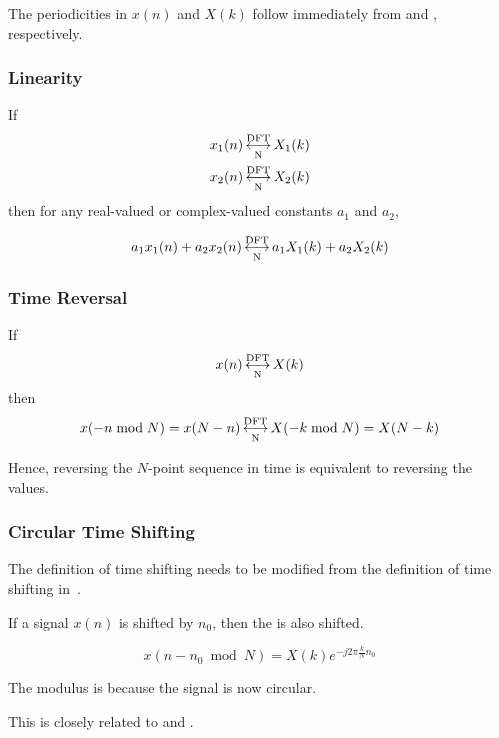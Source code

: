 The periodicities in $x(n)$ and $X(k)$ follow immediately from  and , respectively.

\subsubsection{Linearity}\label{subsubsec:DFT_Properties-Linearity}
If
\begin{align*}
  x_{1}(n) &\operatorname{\overset{\text{DFT}}{\underset{N}{\longleftrightarrow}}} X_{1}(k) \\
  x_{2}(n) &\operatorname{\overset{\text{DFT}}{\underset{N}{\longleftrightarrow}}} X_{2}(k)
\end{align*}
then for any real-valued or complex-valued constants $a_{1}$ and $a_{2}$,

\begin{equation}\label{eq:DFT_Properties-Linearity}
  a_{1}x_{1}(n) + a_{2}x_{2}(n) \operatorname{\overset{\text{DFT}}{\underset{N}{\longleftrightarrow}}} a_{1}X_{1}(k) + a_{2}X_{2}(k)
\end{equation}

\subsubsection{Time Reversal}\label{subsubsec:DFT_Properties-Time_Reversal}
If
\begin{equation*}
  x(n) \operatorname{\overset{\text{DFT}}{\underset{N}{\longleftrightarrow}}} X(k)
\end{equation*}
then
\begin{equation}\label{eq:DFT_Properties-Time_Reversal}
  x(-n \bmod N) = x(N-n) \operatorname{\overset{\text{DFT}}{\underset{N}{\longleftrightarrow}}} X(-k \bmod N) = X(N-k)
\end{equation}

Hence, reversing the $N$-point sequence in time is equivalent to reversing the  values.

\subsubsection{Circular Time Shifting}\label{subsubsec:DFT_Properties-Circular_Time_Shifting}
The definition of time shifting needs to be modified from the definition of time shifting in~.

\begin{definition}\label{def:DFT_Properties-Circular_Time_Shifting}
  If a signal $x(n)$ is shifted by $n_{0}$, then the  is also shifted.

  \begin{equation}\label{eq:DFT_Properties-Circular_Time_Shifting}
    x(n - n_{0} \bmod N) = X(k) e^{-j 2\pi \frac{k}{N} n_{0}}
  \end{equation}

  The modulus is because the signal is now circular.

  \begin{remark}
    This is closely related to  and .
  \end{remark}
\end{definition}

